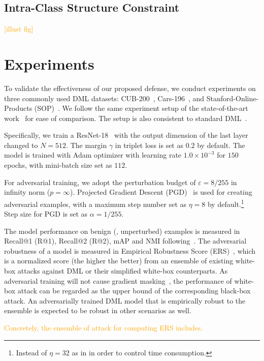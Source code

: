 \documentclass[10pt,twocolumn,letterpaper]{article}
\newcommand{\oo}[1]{\textcolor{orange}{#1}}
\begin{document}
\subsection{Intra-Class Structure Constraint}

\oo{[illust fig]}

\section{Experiments}
\label{sec:4}

To validate the effectiveness of our proposed defense, we conduct experiments
on three commonly used DML datasets: CUB-200~\cite{cub200}, Cars-196~\cite{cars196},
and Stanford-Online-Products (SOP)~\cite{sop}.
%
We follow the same experiment setup of the state-of-the-art work~\cite{robrank}
for ease of comparison.
%
The setup is also consistent to standard DML~\cite{revisiting}.

Specifically, we train a ResNet-18~\cite{resnet} with the output dimension of
the last layer changed to $N=512$.
%
The margin $\gamma$ in triplet loss is set as $0.2$ by default.
%
The model is trained with Adam optimizer with learning rate $1.0\times 10^{-3}$
for $150$ epochs, with mini-batch size set as $112$.

For adversarial training, we adopt the perturbation budget of
$\varepsilon=8/255$ in infinity norm ($p=\infty$).
%
Projected Gradient Descent (PGD)~\cite{madry} is used for creating adversarial
examples, with a maximum step number set as $\eta=8$ by default.\footnote{
Instead of $\eta=32$ as in \cite{robrank} in order to control time consumption.}
%
Step size for PGD is set as $\alpha=1/255$.

The model performance on benign (\ie, unperturbed) examples is measured in
Recall@1 (R@1), Recall@2 (R@2), mAP and NMI
following~\cite{revisiting,robrank}.
%
The adversarial robustness of a model is measured in Empirical Robustness Score
(ERS)~\cite{robrank}, which is a normalized score (the higher the better) from
an ensemble of existing white-box attacks against DML or their simplified
white-box counterparts.
%
As adversarial training will not cause gradient masking~\cite{obfuscated},
the performance of white-box attack can be regarded as the upper bound of the
corresponding black-box attack.
%
An adversarially trained DML model that is empirically robust to the ensemble
is expected to be robust in other scenarios as well.

\oo{Concretely, the ensemble of attack for computing ERS includes.}
\end{document}
